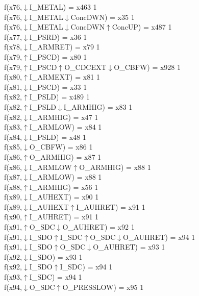 f(x76,$\downarrow$I\_METAL) = x463 {1} \\
f(x76,$\downarrow$I\_METAL$\downarrow$ConcDWN) = x35 {1} \\
f(x76,$\downarrow$I\_METAL$\downarrow$ConcDWN$\uparrow$ConcUP) = x487 {1} \\
f(x77,$\downarrow$I\_PSRD) = x36 {1} \\
f(x78,$\downarrow$I\_ARMRET) = x79 {1} \\
f(x79,$\uparrow$I\_PSCD) = x80 {1} \\
f(x79,$\uparrow$I\_PSCD$\uparrow$O\_CDCEXT$\downarrow$O\_CBFW) = x928 {1} \\
f(x80,$\uparrow$I\_ARMEXT) = x81 {1} \\
f(x81,$\downarrow$I\_PSCD) = x33 {1} \\
f(x82,$\uparrow$I\_PSLD) = x489 {1} \\
f(x82,$\uparrow$I\_PSLD$\downarrow$I\_ARMHIG) = x83 {1} \\
f(x82,$\downarrow$I\_ARMHIG) = x47 {1} \\
f(x83,$\uparrow$I\_ARMLOW) = x84 {1} \\
f(x84,$\downarrow$I\_PSLD) = x48 {1} \\
f(x85,$\downarrow$O\_CBFW) = x86 {1} \\
f(x86,$\uparrow$O\_ARMHIG) = x87 {1} \\
f(x86,$\downarrow$I\_ARMLOW$\uparrow$O\_ARMHIG) = x88 {1} \\
f(x87,$\downarrow$I\_ARMLOW) = x88 {1} \\
f(x88,$\uparrow$I\_ARMHIG) = x56 {1} \\
f(x89,$\downarrow$I\_AUHEXT) = x90 {1} \\
f(x89,$\downarrow$I\_AUHEXT$\uparrow$I\_AUHRET) = x91 {1} \\
f(x90,$\uparrow$I\_AUHRET) = x91 {1} \\
f(x91,$\uparrow$O\_SDC$\downarrow$O\_AUHRET) = x92 {1} \\
f(x91,$\downarrow$I\_SDO$\uparrow$I\_SDC$\uparrow$O\_SDC$\downarrow$O\_AUHRET) = x94 {1} \\
f(x91,$\downarrow$I\_SDO$\uparrow$O\_SDC$\downarrow$O\_AUHRET) = x93 {1} \\
f(x92,$\downarrow$I\_SDO) = x93 {1} \\
f(x92,$\downarrow$I\_SDO$\uparrow$I\_SDC) = x94 {1} \\
f(x93,$\uparrow$I\_SDC) = x94 {1} \\
f(x94,$\downarrow$O\_SDC$\uparrow$O\_PRESSLOW) = x95 {1} \\
